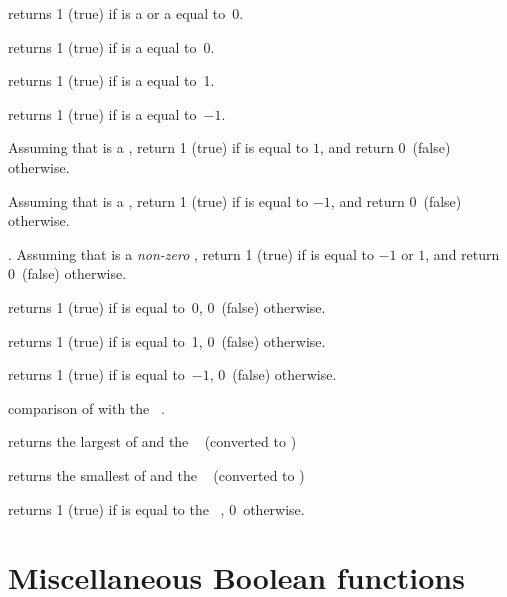  returns 1 (true) if  is a  or
a  equal to~0.

 returns 1 (true) if  is a 
equal to~0.

 returns 1 (true) if  is a 
equal to~1.

 returns 1 (true) if  is a 
equal to~$-1$.

Assuming that  is a , return 1 (true) if  is equal to
$1$, and return 0~(false) otherwise.

Assuming that  is a , return 1 (true) if  is equal to
$-1$, and return 0~(false) otherwise.

. Assuming that  is a
\emph{non-zero} , return 1 (true) if  is equal to $-1$ or
$1$, and return 0~(false) otherwise.

 returns 1 (true) if  is equal to~0, 0~(false)
otherwise.

 returns 1 (true) if  is equal to~1, 0~(false)
otherwise.

 returns 1 (true) if  is equal to~$-1$,
0~(false) otherwise.



 comparison of  with the
~.


 returns the largest of  and
the ~ (converted to )


 returns the smallest of  and the
~ (converted to )


 returns 1 (true) if  is equal to
the ~, 0~otherwise.

\section{Miscellaneous Boolean functions}

